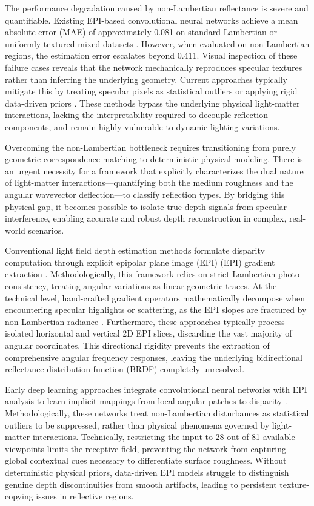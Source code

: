 \documentclass[lettersize,journal]{IEEEtran}
\begin{document}
The performance degradation caused by non-Lambertian reflectance is severe and quantifiable. Existing EPI-based convolutional neural networks achieve a mean absolute error (MAE) of approximately 0.081 on standard Lambertian or uniformly textured mixed datasets \cite{lyu2022}. However, when evaluated on non-Lambertian regions, the estimation error escalates beyond 0.411. Visual inspection of these failure cases reveals that the network mechanically reproduces specular textures rather than inferring the underlying geometry. Current approaches typically mitigate this by treating specular pixels as statistical outliers \cite{zhang2023} or applying rigid data-driven priors \cite{peng2022}. These methods bypass the underlying physical light-matter interactions, lacking the interpretability required to decouple reflection components, and remain highly vulnerable to dynamic lighting variations.

Overcoming the non-Lambertian bottleneck requires transitioning from purely geometric correspondence matching to deterministic physical modeling. There is an urgent necessity for a framework that explicitly characterizes the dual nature of light-matter interactions—quantifying both the medium roughness and the angular wavevector deflection—to classify reflection types. By bridging this physical gap, it becomes possible to isolate true depth signals from specular interference, enabling accurate and robust depth reconstruction in complex, real-world scenarios.

Conventional light field depth estimation methods formulate disparity computation through explicit epipolar plane image (EPI) (EPI) gradient extraction \cite{wanner2014, wang2015}. Methodologically, this framework relies on strict Lambertian photo-consistency, treating angular variations as linear geometric traces. At the technical level, hand-crafted gradient operators mathematically decompose when encountering specular highlights or scattering, as the EPI slopes are fractured by non-Lambertian radiance \cite{tao2013}. Furthermore, these approaches typically process isolated horizontal and vertical 2D EPI slices, discarding the vast majority of angular coordinates. This directional rigidity prevents the extraction of comprehensive angular frequency responses, leaving the underlying bidirectional reflectance distribution function (BRDF) completely unresolved.

Early deep learning approaches integrate convolutional neural networks with EPI analysis to learn implicit mappings from local angular patches to disparity \cite{heber2018, lyu2022}. Methodologically, these networks treat non-Lambertian disturbances as statistical outliers to be suppressed, rather than physical phenomena governed by light-matter interactions. Technically, restricting the input to 28 out of 81 available viewpoints limits the receptive field, preventing the network from capturing global contextual cues necessary to differentiate surface roughness. Without deterministic physical priors, data-driven EPI models struggle to distinguish genuine depth discontinuities from smooth artifacts, leading to persistent texture-copying issues in reflective regions.
\end{document}
